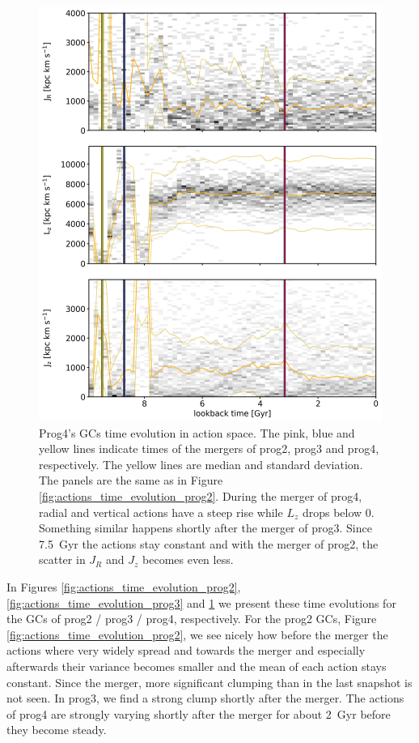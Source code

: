 \begin{figure}[htbp]
\captionsetup{format=plain}
    \centering
	\includegraphics[width=\textwidth]{plots/Dynamics/prog4/action_time_evolution_hist_mean_prog4.png}
    \caption{Prog4's \acp{GC} time evolution in action space. The pink, blue and yellow lines indicate times of the mergers of prog2, prog3 and prog4, respectively. The yellow lines are median and standard deviation. The panels are the same as in Figure \ref{fig:actions_time_evolution_prog2}. During the merger of prog4, radial and vertical actions have a steep rise while $L_z$ drops below 0. Something similar happens shortly after the merger of prog3. Since \SI{7.5}{Gyr} the actions stay constant and with the merger of prog2, the scatter in $J_R$ and $J_z$ becomes even less.}\label{fig:actions_time_evolution_prog4}
\end{figure}
In Figures \ref{fig:actions_time_evolution_prog2}, \ref{fig:actions_time_evolution_prog3} and \ref{fig:actions_time_evolution_prog4} we present these time evolutions for the \acp{GC} of prog2 / prog3 / prog4, respectively. For the prog2 \acp{GC}, Figure \ref{fig:actions_time_evolution_prog2}, we see nicely how before the merger the actions where very widely spread and towards the merger and especially afterwards their variance becomes smaller and the mean of each action stays constant. Since the merger, more significant clumping than in the last snapshot is not seen. In prog3, we find a strong clump shortly after the merger. The actions of prog4 are strongly varying shortly after the merger for about \SI{2}{Gyr} before they become steady.

